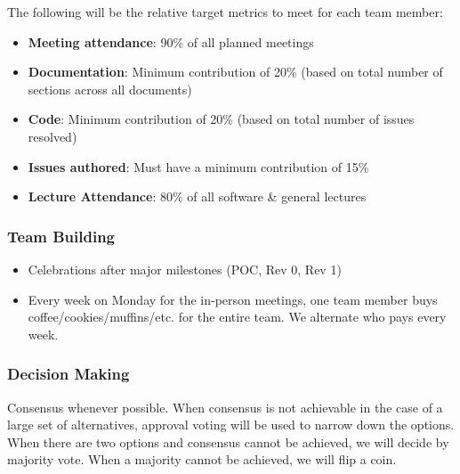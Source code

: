\documentclass{article}
\begin{document}
The following will be the relative target metrics to meet for each team member:
\begin{itemize}
    \item \textbf{Meeting attendance}: 90\% of all planned meetings
    \item \textbf{Documentation}: Minimum contribution of 20\% (based on total number of sections across all documents)
    \item \textbf{Code}: Minimum contribution of 20\% (based on total number of issues resolved)
    \item \textbf{Issues authored}: Must have a minimum contribution of 15\%
    \item \textbf{Lecture Attendance}: 80\% of all software & general lectures
\end{itemize}

\subsubsection*{Team Building}

\begin{itemize}
    \item Celebrations after major milestones (POC, Rev 0, Rev 1)
    \item Every week on Monday for the in-person meetings, one team member buys coffee/cookies/muffins/etc. for the entire team. We alternate who pays every week.
\end{itemize}

\subsubsection*{Decision Making} 

Consensus whenever possible. When consensus is not achievable in the case of a large set of alternatives, approval voting will be used to narrow down the options. When there are two options and consensus cannot be achieved, we will decide by majority vote. When a majority cannot be achieved, we will flip a coin.
\end{document}

